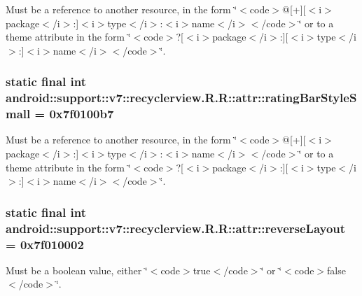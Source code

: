 Must be a reference to another resource, in the form \char`\"{}$<$code$>$@\mbox{[}+\mbox{]}\mbox{[}$<$i$>$package$<$/i$>$:\mbox{]}$<$i$>$type$<$/i$>$:$<$i$>$name$<$/i$>$$<$/code$>$\char`\"{} or to a theme attribute in the form \char`\"{}$<$code$>$?\mbox{[}$<$i$>$package$<$/i$>$:\mbox{]}\mbox{[}$<$i$>$type$<$/i$>$:\mbox{]}$<$i$>$name$<$/i$>$$<$/code$>$\char`\"{}. \hypertarget{classandroid_1_1support_1_1v7_1_1recyclerview_1_1_r_1_1attr_f39e91b9d8a566b5091e2165fd89397e}{
\subsubsection[{ratingBarStyleSmall}]{\setlength{\rightskip}{0pt plus 5cm}static final int android::support::v7::recyclerview.R.R::attr::ratingBarStyleSmall = 0x7f0100b7}}
\label{classandroid_1_1support_1_1v7_1_1recyclerview_1_1_r_1_1attr_f39e91b9d8a566b5091e2165fd89397e}


Must be a reference to another resource, in the form \char`\"{}$<$code$>$@\mbox{[}+\mbox{]}\mbox{[}$<$i$>$package$<$/i$>$:\mbox{]}$<$i$>$type$<$/i$>$:$<$i$>$name$<$/i$>$$<$/code$>$\char`\"{} or to a theme attribute in the form \char`\"{}$<$code$>$?\mbox{[}$<$i$>$package$<$/i$>$:\mbox{]}\mbox{[}$<$i$>$type$<$/i$>$:\mbox{]}$<$i$>$name$<$/i$>$$<$/code$>$\char`\"{}. \hypertarget{classandroid_1_1support_1_1v7_1_1recyclerview_1_1_r_1_1attr_b2175d430375ca5880643eac30f325cb}{
\subsubsection[{reverseLayout}]{\setlength{\rightskip}{0pt plus 5cm}static final int android::support::v7::recyclerview.R.R::attr::reverseLayout = 0x7f010002}}
\label{classandroid_1_1support_1_1v7_1_1recyclerview_1_1_r_1_1attr_b2175d430375ca5880643eac30f325cb}


Must be a boolean value, either \char`\"{}$<$code$>$true$<$/code$>$\char`\"{} or \char`\"{}$<$code$>$false$<$/code$>$\char`\"{}. 

